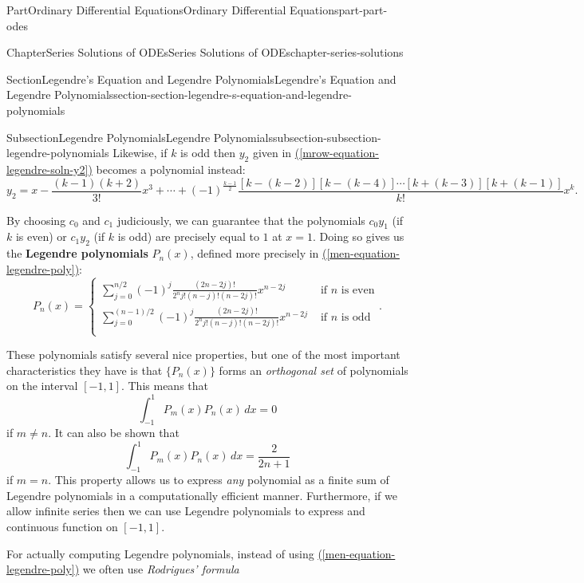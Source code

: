 \documentclass[twoside,10pt,]{book}
\newcommand{\xreffont}{\relax}
\newcommand{\terminology}[1]{\textbf{#1}}
\numberwithin{equation}{part}
\begin{document}
\begin{partptx}{Part}{Ordinary Differential Equations}{}{Ordinary Differential Equations}{}{}{part-part-odes}
\begin{chapterptx}{Chapter}{Series Solutions of ODEs}{}{Series Solutions of ODEs}{}{}{chapter-series-solutions}
\begin{sectionptx}{Section}{Legendre's Equation and Legendre Polynomials}{}{Legendre's Equation and Legendre Polynomials}{}{}{section-section-legendre-s-equation-and-legendre-polynomials}
\begin{subsectionptx}{Subsection}{Legendre Polynomials}{}{Legendre Polynomials}{}{}{subsection-subsection-legendre-polynomials}
Likewise, if \(k\) is odd then \(y_{2}\) given in \hyperref[mrow-equation-legendre-soln-y2]{({\xreffont\ref{mrow-equation-legendre-soln-y2}})} becomes a polynomial instead:%
\begin{equation*}
y_{2} = x - \frac{(k-1)(k+2)}{3!}x^{3} + \cdots + (-1)^{\frac{k-1}{2}}\frac{[k - (k - 2)][k - (k - 4)]\cdots[k + (k - 3)][k + (k - 1)]}{k!}x^{k}\text{.}
\end{equation*}
%
\par
By choosing \(c_{0}\) and \(c_{1}\) judiciously, we can guarantee that the polynomials \(c_{0}y_{1}\) (if \(k\) is even) or \(c_{1}y_{2}\) (if \(k\) is odd) are precisely equal to \(1\) at \(x = 1\). Doing so gives us the \terminology{Legendre polynomials} \(P_{n}(x)\), defined more precisely in \hyperref[men-equation-legendre-poly]{({\xreffont\ref{men-equation-legendre-poly}})}:%
\begin{equation}
P_{n}(x) = \begin{cases} \sum_{j = 0}^{n/2}(-1)^{j}\frac{(2n - 2j)!}{2^{n}j!(n - j)!(n - 2j)!}x^{n - 2j} & \text{ if }n\text{ is even} \\
\sum_{j = 0}^{(n-1)/2}(-1)^{j}\frac{(2n - 2j)!}{2^{n}j!(n - j)!(n - 2j)!}x^{n - 2j} & \text{ if }n\text{ is odd} \\ \end{cases}\text{.}\label{men-equation-legendre-poly}
\end{equation}
%
\par
These polynomials satisfy several nice properties, but one of the most important characteristics they have is that \(\{P_{n}(x)\}\) forms an \emph{orthogonal set} of polynomials on the interval \([-1,1]\). This means that%
\begin{equation*}
\int_{-1}^{1}P_{m}(x)P_{n}(x)\,dx = 0
\end{equation*}
if \(m\neq n\). It can also be shown that%
\begin{equation*}
\int_{-1}^{1}P_{m}(x)P_{n}(x)\,dx = \frac{2}{2n+1}
\end{equation*}
if \(m = n\). This property allows us to express \emph{any} polynomial as a finite sum of Legendre polynomials in a computationally efficient manner. Furthermore, if we allow infinite series then we can use Legendre polynomials to express and continuous function on \([-1,1]\).%
\par
For actually computing Legendre polynomials, instead of using \hyperref[men-equation-legendre-poly]{({\xreffont\ref{men-equation-legendre-poly}})} we often use \emph{Rodrigues' formula}%
\begin{equation}

\end{equation}
\end{subsectionptx}
\end{sectionptx}
\end{chapterptx}
\end{partptx}
\end{document}
